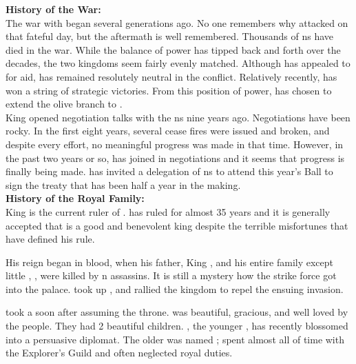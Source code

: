 \documentclass[blue]{NeptuneBall}
\begin{document}
\name{\bAtlantican{}}



{\bf History of the War:}\\
The war with \pPacifica{} began several generations ago. No one remembers why \pPacifica{} attacked on that fateful day, but the aftermath is well remembered. Thousands of \pAtlantis{}ns have died in the war. While the balance of power has tipped back and forth over the decades, the two kingdoms seem fairly evenly matched. Although \pAtlantis{} has appealed to \pIndia{} for aid, \pIndia{} has remained resolutely neutral in the conflict. Relatively recently, \pAtlantis{} has won a string of strategic victories. From this position of power, \cKing{\King} \cKing{} has chosen to extend the olive branch to \pPacifica{}.\\

King \cKing{\MYname{}} opened negotiation talks with the \pPacifica{}ns nine years ago. Negotiations have been rocky. In the first eight years, several cease fires were issued and broken, and despite every effort, no meaningful progress was made in that time. However, in the past two years or so, \cPrincess{\Prince} \cPrincess{} has joined \cPrincess{\their} \cKing{\parent} in negotiations and it seems that progress is finally being made. \cKing{\King} \cKing{} has  invited a delegation of \pPacifica{}ns to attend this year's \cExExKing{} Ball to sign the treaty that has been half a year in the making.\\


{\bf History of the Royal Family:}\\
King \cKing{\MYname{}} is the current ruler of \pAtlantis{}. \cKing{\They} has ruled for almost 35 years and it is generally accepted that \cKing{\they} is a good and benevolent king despite the terrible misfortunes that have defined his rule.

His reign began in blood, when his father, King \cExKing{}, and his entire family except \cKing{\their} little \cPlant{\sibling}, \cPlant{}, were killed by \pPacifica{}n assassins. It is still a mystery how the strike force got into the palace. \cKing{} took up \iTrident{\MYname{}}, and rallied the kingdom to repel the ensuing invasion.

\cKing{\King} \cKing{} took a \cQueen{\spouse} soon after assuming the throne. \cQueen{\King} \cQueen{} was beautiful, gracious, and well loved by the people. They had 2 beautiful children. \cPrincess{\Prince} \cPrincess{}, the younger \cPrincess{\offspring}, has recently blossomed into a persuasive diplomat. The older \cAriel{\Prince} was named \cAriel{}; \cAriel{} spent almost all of \cAriel{\their} time with the Explorer's Guild and often neglected \cAriel{\their} royal duties. 
\end{document}

